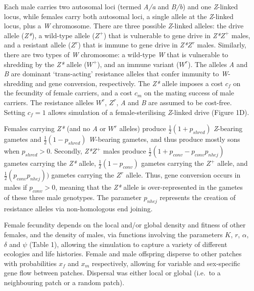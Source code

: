 \documentclass[]{rsos}%
\begin{document}
Each male carries two autosomal loci (termed \emph{A/a} and \emph{B/b})
and one \emph{Z}-linked locus, while females carry both autosomal loci,
a single allele at the \emph{Z}-linked locus, plus a \emph{W}
chromosome. There are three possible \emph{Z}-linked alleles: the drive
allele (\emph{Z*}), a wild-type allele (\(Z^+\)) that is vulnerable to
gene drive in \emph{Z*}\(Z^+\) males, and a resistant allele (\(Z^r\))
that is immune to gene drive in \emph{Z*}\(Z^r\) males. Similarly, there
are two types of \emph{W} chromosome: a wild-type \emph{W} that is
vulnerable to shredding by the \emph{Z*} allele (\(W^+\)), and an immune
variant (\(W^r\)). The alleles \emph{A} and \emph{B} are dominant
`trans-acting' resistance alleles that confer immunity to
\emph{W}-shredding and gene conversion, respectively. The \emph{Z*}
allele imposes a cost \(c_f\) on the fecundity of female carriers, and a
cost \(c_m\) on the mating success of male carriers. The resistance
alleles \(W^r\), \(Z^r\), \emph{A} and \emph{B} are assumed to be
cost-free. Setting \(c_f = 1\) allows simulation of a female-sterilising
\emph{Z}-linked drive (Figure 1D).

Females carrying \emph{Z*} (and no \emph{A} or \(W^r\) alleles) produce
\(\frac{1}{2}(1 + p_{shred})\) \emph{Z}-bearing gametes and
\(\frac{1}{2}(1 - p_{shred})\) \emph{W}-bearing gametes, and thus
produce mostly sons when \(p_{shred} > 0\). Secondly, \emph{Z*}\(Z^+\)
males produce \(\frac{1}{2}(1 + p_{conv} - p_{conv} p_{nhej})\) gametes
carrying the \emph{Z*} allele, \(\frac{1}{2}(1 - p_{conv})\) gametes
carrying the \(Z^+\) allele, and \(\frac{1}{2}(p_{conv} p_{nhej}))\)
gametes carrying the \(Z^r\) allele. Thus, gene conversion occurs in
males if \(p_{conv} > 0\), meaning that the \emph{Z*} allele is
over-represented in the gametes of these three male genotypes. The
parameter \(p_{nhej}\) represents the creation of resistance alleles via
non-homologous end joining.

Female fecundity depends on the local and/or global density and fitness
of other females, and the density of males, via functions involving the
parameters \(K\), \(r\), \(\alpha\), \(\delta\) and \(\psi\) (Table 1),
allowing the simulation to capture a variety of different ecologies and
life histories. Female and male offspring disperse to other patches with
probabilities \(x_f\) and \(x_m\) respectively, allowing for variable
and sex-specific gene flow between patches. Dispersal was either local
or global (i.e.~to a neighbouring patch or a random patch).
\end{document}
